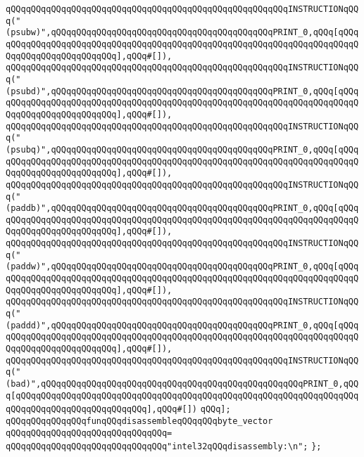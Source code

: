 \verb|qQQqqQQqqQQqqQQqqQQqqQQqqQQqqQQqqQQqqQQqqQQqqQQqqQQqqQQqINSTRUCTIONqQQq("(psubw)",qQQqqQQqqQQqqQQqqQQqqQQqqQQqqQQqqQQqqQQqqQQqPRINT_0,qQQq[qQQqqQQqqQQqqQQqqQQqqQQqqQQqqQQqqQQqqQQqqQQqqQQqqQQqqQQqqQQqqQQqqQQqqQQqqQQqqQQqqQQqqQQqqQQqqQQq],qQQq#[]),|\newline
\verb|qQQqqQQqqQQqqQQqqQQqqQQqqQQqqQQqqQQqqQQqqQQqqQQqqQQqqQQqINSTRUCTIONqQQq("(psubd)",qQQqqQQqqQQqqQQqqQQqqQQqqQQqqQQqqQQqqQQqqQQqPRINT_0,qQQq[qQQqqQQqqQQqqQQqqQQqqQQqqQQqqQQqqQQqqQQqqQQqqQQqqQQqqQQqqQQqqQQqqQQqqQQqqQQqqQQqqQQqqQQqqQQqqQQq],qQQq#[]),|\newline
\verb|qQQqqQQqqQQqqQQqqQQqqQQqqQQqqQQqqQQqqQQqqQQqqQQqqQQqqQQqINSTRUCTIONqQQq("(psubq)",qQQqqQQqqQQqqQQqqQQqqQQqqQQqqQQqqQQqqQQqqQQqPRINT_0,qQQq[qQQqqQQqqQQqqQQqqQQqqQQqqQQqqQQqqQQqqQQqqQQqqQQqqQQqqQQqqQQqqQQqqQQqqQQqqQQqqQQqqQQqqQQqqQQqqQQq],qQQq#[]),|\newline
\verb|qQQqqQQqqQQqqQQqqQQqqQQqqQQqqQQqqQQqqQQqqQQqqQQqqQQqqQQqINSTRUCTIONqQQq("(paddb)",qQQqqQQqqQQqqQQqqQQqqQQqqQQqqQQqqQQqqQQqqQQqPRINT_0,qQQq[qQQqqQQqqQQqqQQqqQQqqQQqqQQqqQQqqQQqqQQqqQQqqQQqqQQqqQQqqQQqqQQqqQQqqQQqqQQqqQQqqQQqqQQqqQQqqQQq],qQQq#[]),|\newline
\verb|qQQqqQQqqQQqqQQqqQQqqQQqqQQqqQQqqQQqqQQqqQQqqQQqqQQqqQQqINSTRUCTIONqQQq("(paddw)",qQQqqQQqqQQqqQQqqQQqqQQqqQQqqQQqqQQqqQQqqQQqPRINT_0,qQQq[qQQqqQQqqQQqqQQqqQQqqQQqqQQqqQQqqQQqqQQqqQQqqQQqqQQqqQQqqQQqqQQqqQQqqQQqqQQqqQQqqQQqqQQqqQQqqQQq],qQQq#[]),|\newline
\verb|qQQqqQQqqQQqqQQqqQQqqQQqqQQqqQQqqQQqqQQqqQQqqQQqqQQqqQQqINSTRUCTIONqQQq("(paddd)",qQQqqQQqqQQqqQQqqQQqqQQqqQQqqQQqqQQqqQQqqQQqPRINT_0,qQQq[qQQqqQQqqQQqqQQqqQQqqQQqqQQqqQQqqQQqqQQqqQQqqQQqqQQqqQQqqQQqqQQqqQQqqQQqqQQqqQQqqQQqqQQqqQQqqQQq],qQQq#[]),|\newline
\verb|qQQqqQQqqQQqqQQqqQQqqQQqqQQqqQQqqQQqqQQqqQQqqQQqqQQqqQQqINSTRUCTIONqQQq("(bad)",qQQqqQQqqQQqqQQqqQQqqQQqqQQqqQQqqQQqqQQqqQQqqQQqqQQqPRINT_0,qQQq[qQQqqQQqqQQqqQQqqQQqqQQqqQQqqQQqqQQqqQQqqQQqqQQqqQQqqQQqqQQqqQQqqQQqqQQqqQQqqQQqqQQqqQQqqQQqqQQq],qQQq#[])|\newline
\newline
\verb|qQQq];|\newline
\newline
\verb|qQQqqQQqqQQqqQQqfunqQQqdisassembleqQQqqQQqbyte_vector|\newline
\verb|qQQqqQQqqQQqqQQqqQQqqQQqqQQqqQQq=|\newline
\verb|qQQqqQQqqQQqqQQqqQQqqQQqqQQqqQQq"intel32qQQqdisassembly:\n";|\newline
\newline
\verb|};|\newline
\newline


